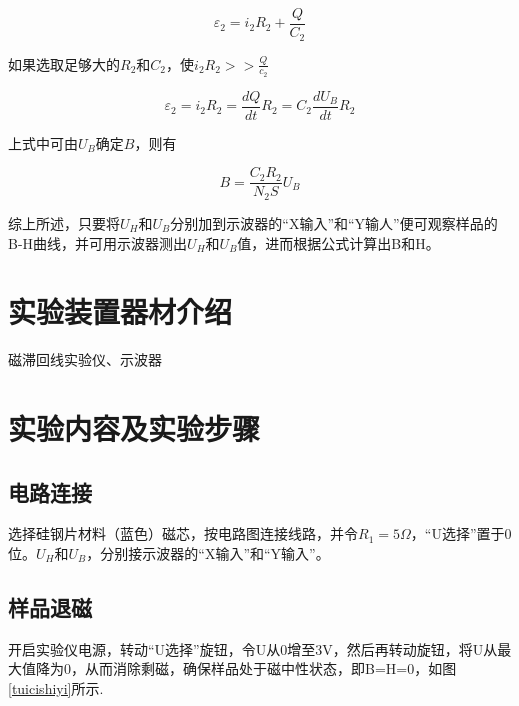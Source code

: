 \documentclass{ctexart}
\begin{document}
  \begin{equation}
    \varepsilon_{2} = i_{2}R_{2} + \frac{Q}{C_{2}}
  \end{equation}

  如果选取足够大的$R_{2}$和$C_{2}$，使$i_{2}R_{2}>>\frac{Q}{c_{2}}$

  \begin{equation}
    \varepsilon_{2}=i_{2}R_{2}=\frac{dQ}{dt}R_{2}=C_{2}\frac{dU_{B}}{dt}R_{2}
  \end{equation}

  上式中可由$U_{B}$确定$B$，则有

  \begin{equation}
    B=\frac{C_{2}R_{2}}{N_{2}S} U_{B}
  \end{equation}

  综上所述，只要将$U_{H}$和$U_{B}$分别加到示波器的“X输入”和“Y输人”便可观察样品的B-H曲线，并可用示波器测出$U_{H}$和$U_{B}$值，进而根据公式计算出B和H。

\section{实验装置器材介绍}
磁滞回线实验仪、示波器

\section{实验内容及实验步骤}
  \subsection{电路连接}
  选择硅钢片材料（蓝色）磁芯，按电路图连接线路，并令$R_{1}=5\Omega$，“U选择”置于0位。$U_{H}$和$U_{B}$，分别接示波器的“X输入”和“Y输入”。

  \subsection{样品退磁}
  开启实验仪电源，转动“U选择”旋钮，令U从0增至3V，然后再转动旋钮，将U从最大值降为0，从而消除剩磁，确保样品处于磁中性状态，即B=H=0，如图\ref{tuicishiyi}所示.
\end{document}
